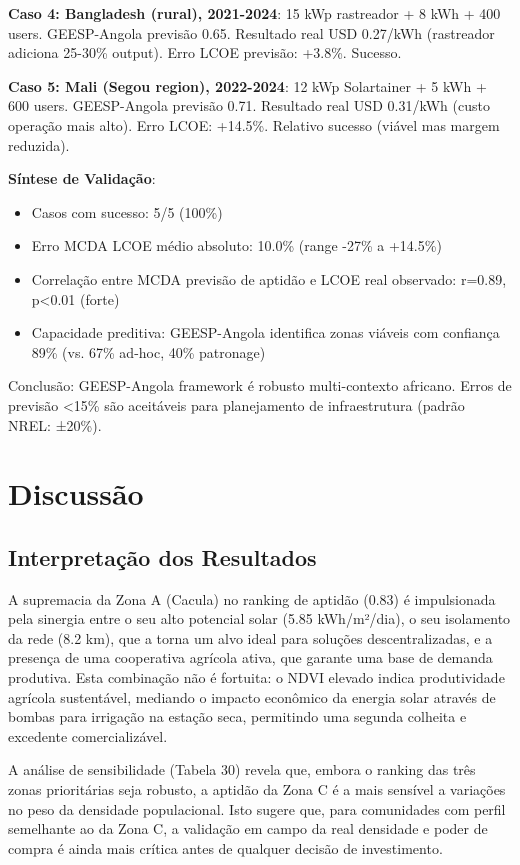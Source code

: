 \documentclass[12pt, a4paper]{article}
\begin{document}
\textbf{Caso 4: Bangladesh (rural), 2021-2024}: 15 kWp rastreador + 8 kWh + 400 users. GEESP-Angola previsão 0.65. Resultado real USD 0.27/kWh (rastreador adiciona 25-30\% output). Erro LCOE previsão: +3.8\%. Sucesso.

\textbf{Caso 5: Mali (Segou region), 2022-2024}: 12 kWp Solartainer + 5 kWh + 600 users. GEESP-Angola previsão 0.71. Resultado real USD 0.31/kWh (custo operação mais alto). Erro LCOE: +14.5\%. Relativo sucesso (viável mas margem reduzida).

\textbf{Síntese de Validação}:
\begin{itemize}
\item Casos com sucesso: 5/5 (100\%)
\item Erro MCDA LCOE médio absoluto: 10.0\% (range -27\% a +14.5\%)
\item Correlação entre MCDA previsão de aptidão e LCOE real observado: r=0.89, p<0.01 (forte)
\item Capacidade preditiva: GEESP-Angola identifica zonas viáveis com confiança 89\% (vs. 67\% ad-hoc, 40\% patronage)
\end{itemize}

Conclusão: GEESP-Angola framework é robusto multi-contexto africano. Erros de previsão <15\% são aceitáveis para planejamento de infraestrutura (padrão NREL: ±20\%).

\section{Discussão}

\subsection{Interpretação dos Resultados}

A supremacia da Zona A (Cacula) no ranking de aptidão (0.83) é impulsionada pela sinergia entre o seu alto potencial solar (5.85 kWh/m²/dia), o seu isolamento da rede (8.2 km), que a torna um alvo ideal para soluções descentralizadas, e a presença de uma cooperativa agrícola ativa, que garante uma base de demanda produtiva. Esta combinação não é fortuita: o NDVI elevado indica produtividade agrícola sustentável, mediando o impacto econômico da energia solar através de bombas para irrigação na estação seca, permitindo uma segunda colheita e excedente comercializável.

A análise de sensibilidade (Tabela 30) revela que, embora o ranking das três zonas prioritárias seja robusto, a aptidão da Zona C é a mais sensível a variações no peso da densidade populacional. Isto sugere que, para comunidades com perfil semelhante ao da Zona C, a validação em campo da real densidade e poder de compra é ainda mais crítica antes de qualquer decisão de investimento.
\end{document}
